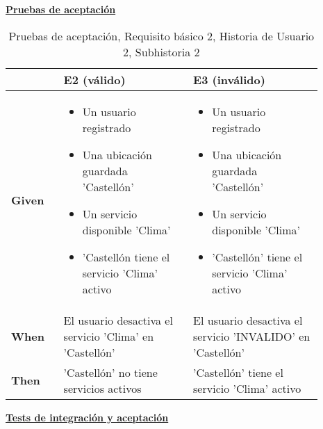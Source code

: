 \documentclass[../ei103948-project-documentation.tex]{subfiles}
\begin{document}
\begin{center}
						\textbf{\underline{Pruebas de aceptación}}
						\begin{table}[H]
							\centering
							\begin{tabular}{|p{0.15\linewidth}|p{0.37\linewidth}|p{0.37\linewidth}|}
								\hline
								& \textbf{E2 (válido)}                                    & \textbf{E3 (inválido)}                                     \\ \hline
				 \textbf{Given} & \begin{itemize}\vspace{-5mm}\setlength\itemsep{0mm}\setlength\parskip{0mm}\setlength{\itemindent}{-5mm}
					 \item Un usuario registrado
					 \item Una ubicación guardada 'Castellón'
					 \item Un servicio disponible 'Clima'
					 \item 'Castellón tiene el servicio 'Clima' activo
				 \end{itemize}                                             & 
				 \begin{itemize}\vspace{-5mm}\setlength\itemsep{0mm}\setlength\parskip{0mm}\setlength{\itemindent}{-5mm}
					 \item Un usuario registrado
					 \item Una ubicación guardada 'Castellón'
					 \item Un servicio disponible 'Clima'
					 \item 'Castellón' tiene el servicio 'Clima' activo
				 \end{itemize}                                                   \\ \hline
				 \textbf{When}  & El usuario desactiva el servicio 'Clima' en 'Castellón' & El usuario desactiva el servicio 'INVALIDO' en 'Castellón' \\ \hline
				 \textbf{Then}  & 'Castellón' no tiene servicios activos                  & 'Castellón' tiene el servicio 'Clima' activo               \\ \hline
				 \end{tabular}
							\caption{Pruebas de aceptación, Requisito básico 2, Historia de Usuario 2, Subhistoria 2}
						\end{table}
						\end{center}

						\newpage

						\begin{center}
							\textbf{\underline{Tests de integración y aceptación}}
						\end{center}
	
\end{document}
